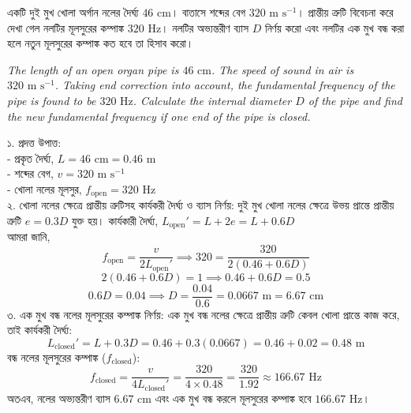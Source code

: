\documentclass[12pt, a4paper]{article}
\begin{document}
\vspace{1.5em}

\begin{tcolorbox}[questionbox={প্রশ্ন (Question) 3}]
\noindent
একটি দুই মুখ খোলা অর্গান নলের দৈর্ঘ্য $46\text{ cm}$। বাতাসে শব্দের বেগ $320\text{ m s}^{-1}$। প্রান্তীয় ত্রুটি বিবেচনা করে দেখা গেল নলটির মূলসুরের কম্পাঙ্ক $320\text{ Hz}$। নলটির অভ্যন্তরীণ ব্যাস $D$ নির্ণয় করো এবং নলটির এক মুখ বন্ধ করা হলে নতুন মূলসুরের কম্পাঙ্ক কত হবে তা হিসাব করো।

\vspace{0.8em}
\begin{english}
\noindent\textit{\color{darkgray}
The length of an open organ pipe is $46\text{ cm}$. The speed of sound in air is $320\text{ m s}^{-1}$. Taking end correction into account, the fundamental frequency of the pipe is found to be $320\text{ Hz}$. Calculate the internal diameter $D$ of the pipe and find the new fundamental frequency if one end of the pipe is closed.
}
\end{english}
\end{tcolorbox}

\vspace{1em}

\begin{tcolorbox}[solutionbox={সমাধান (Solution)}]
\noindent
১. প্রদত্ত উপাত্ত: \\
- প্রকৃত দৈর্ঘ্য, $L = 46\text{ cm} = 0.46\text{ m}$ \\
- শব্দের বেগ, $v = 320\text{ m s}^{-1}$ \\
- খোলা নলের মূলসুর, $f_{\text{open}} = 320\text{ Hz}$ \\
২. খোলা নলের ক্ষেত্রে প্রান্তীয় ত্রুটিসহ কার্যকরী দৈর্ঘ্য ও ব্যাস নির্ণয়: দুই মুখ খোলা নলের ক্ষেত্রে উভয় প্রান্তে প্রান্তীয় ত্রুটি $e = 0.3D$ যুক্ত হয়। কার্যকারী দৈর্ঘ্য, $L_{\text{open}}' = L + 2e = L + 0.6D$ \\
আমরা জানি,
\[ f_{\text{open}} = \frac{v}{2 L_{\text{open}}'} \implies 320 = \frac{320}{2(0.46 + 0.6D)} \]
\[ 2(0.46 + 0.6D) = 1 \implies 0.46 + 0.6D = 0.5 \]
\[ 0.6D = 0.04 \implies D = \frac{0.04}{0.6} = 0.0667\text{ m} = 6.67\text{ cm} \]
৩. এক মুখ বন্ধ নলের মূলসুরের কম্পাঙ্ক নির্ণয়: এক মুখ বন্ধ নলের ক্ষেত্রে প্রান্তীয় ত্রুটি কেবল খোলা প্রান্তে কাজ করে, তাই কার্যকরী দৈর্ঘ্য:
\[ L_{\text{closed}}' = L + 0.3D = 0.46 + 0.3(0.0667) = 0.46 + 0.02 = 0.48\text{ m} \]
বন্ধ নলের মূলসুরের কম্পাঙ্ক ($f_{\text{closed}}$):
\[ f_{\text{closed}} = \frac{v}{4 L_{\text{closed}}'} = \frac{320}{4 \times 0.48} = \frac{320}{1.92} \approx 166.67\text{ Hz} \]
অতএব, নলের অভ্যন্তরীণ ব্যাস $6.67\text{ cm}$ এবং এক মুখ বন্ধ করলে মূলসুরের কম্পাঙ্ক হবে $166.67\text{ Hz}$।
\end{tcolorbox}
\end{document}
